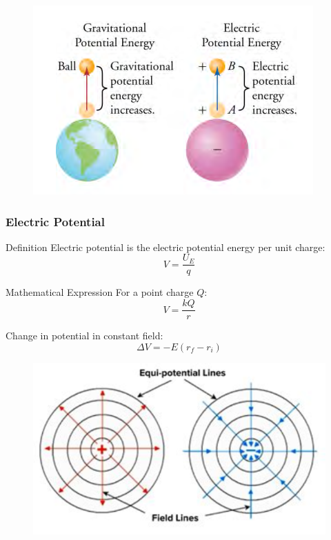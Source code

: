 \documentclass{beamer}
\begin{document}
\begin{frame}
\begin{figure}
    \centering
    \includegraphics[width=0.75\linewidth]{gravpotue.png}
\end{figure}
\end{frame}

\begin{frame}
    \frametitle{Electric Potential}
    \begin{block}{Definition}
        Electric potential is the electric potential energy per unit charge:
        \begin{equation}
            V = \frac{U_E}{q}
        \end{equation}
    \end{block}
    
    \begin{block}{Mathematical Expression}
        For a point charge $Q$:
        \begin{equation}
            V = \frac{kQ}{r}
        \end{equation}
        
        Change in potential in constant field:
        \begin{equation}
            \Delta V = -E(r_f - r_i)
        \end{equation}
    \end{block}
    \end{frame}

\begin{frame}
    
   \begin{figure}
       \centering
       \includegraphics[width=1\linewidth]{eqpntlne.png}
   \end{figure}
    
\end{frame}
\end{document}
